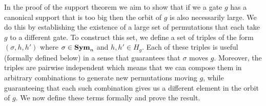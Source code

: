 \documentclass[../paper.tex]{subfiles}
\begin{document}



In the proof of the support theorem we aim to show that if we a gate $g$ has a
canonical support that is too big then the orbit of $g$ is also necessarily
large. We do this by establishing the existence of a large set of permutations
that each take $g$ to a different gate. To construct this set, we define a set
of triples of the form $(\sigma, h, h')$ where $\sigma \in \text{\textbf{Sym}}_n$ and $h,h' \in
H_g$. Each of these triples is useful (formally defined below) in a sense that
guarantees that $\sigma$ moves $g$. Moreover, the triples are pairwise
independent which means that we can compose them in arbitrary combinations to
generate new permutations moving $g$, while guaranteeing that each such
combination gives us a different element in the orbit of $g$. We now define
these terms formally and prove the result.




\end{document}
